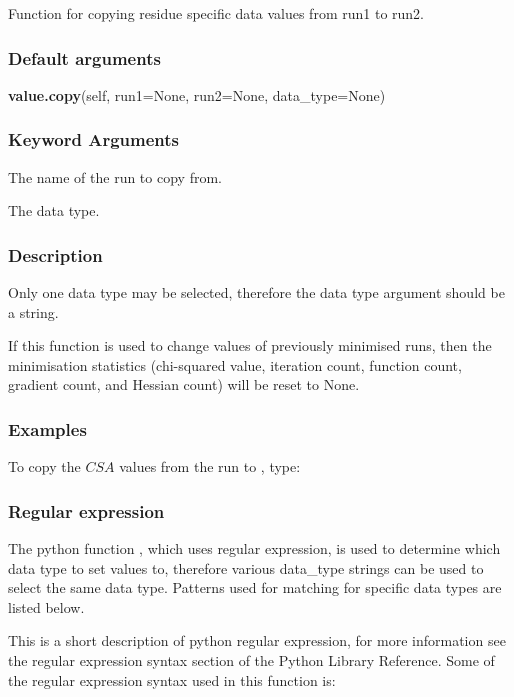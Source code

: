 Function for copying residue specific data values from run1 to run2.

\subsubsection{Default arguments}

\textsf{\textbf{value.copy}(self, run1=None, run2=None, data\_type=None)}


\subsubsection{Keyword Arguments}

  The name of the run to copy from.

  The data type.

\subsubsection{Description}

Only one data type may be selected, therefore the data type argument should be a string.

If this function is used to change values of previously minimised runs, then the
minimisation statistics (chi-squared value, iteration count, function count, gradient count,
and Hessian count) will be reset to None.


\subsubsection{Examples}

To copy the $CSA$ values from the run 
 to 
, type:






\subsubsection{Regular expression}

The python function 
, which uses regular expression, is used to determine which data
type to set values to, therefore various data\_type strings can be used to select the same
data type.  Patterns used for matching for specific data types are listed below.

This is a short description of python regular expression, for more information see the
regular expression syntax section of the Python Library Reference.  Some of the regular
expression syntax used in this function is:

